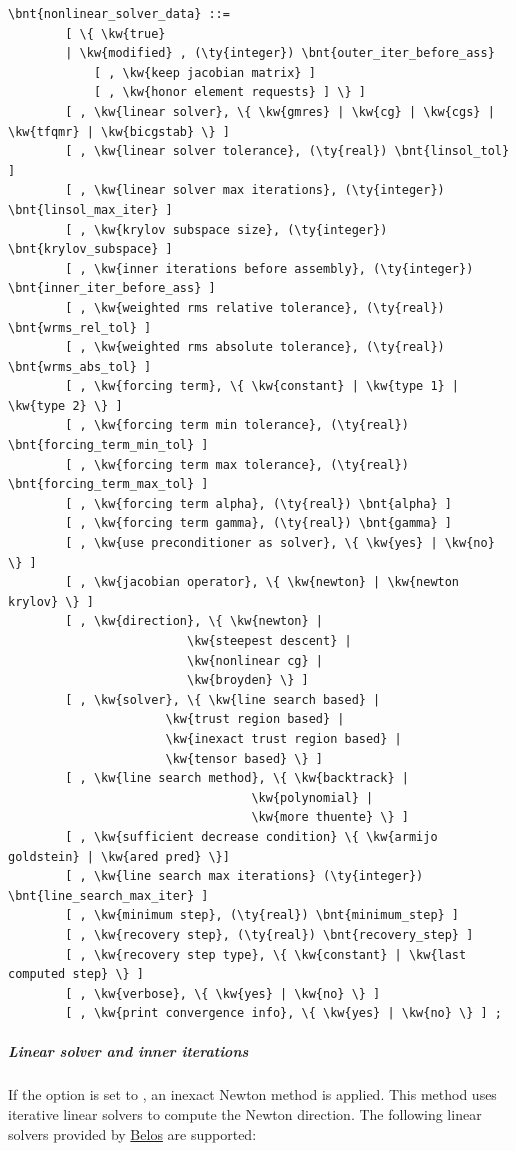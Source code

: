 \begin{Verbatim}[commandchars=\\\{\}]
    \bnt{nonlinear_solver_data} ::=
        [ \{ \kw{true}
        | \kw{modified} , (\ty{integer}) \bnt{outer_iter_before_ass}
            [ , \kw{keep jacobian matrix} ]
            [ , \kw{honor element requests} ] \} ]
        [ , \kw{linear solver}, \{ \kw{gmres} | \kw{cg} | \kw{cgs} | \kw{tfqmr} | \kw{bicgstab} \} ]
        [ , \kw{linear solver tolerance}, (\ty{real}) \bnt{linsol_tol} ]
        [ , \kw{linear solver max iterations}, (\ty{integer}) \bnt{linsol_max_iter} ]
        [ , \kw{krylov subspace size}, (\ty{integer}) \bnt{krylov_subspace} ]
        [ , \kw{inner iterations before assembly}, (\ty{integer}) \bnt{inner_iter_before_ass} ]
        [ , \kw{weighted rms relative tolerance}, (\ty{real}) \bnt{wrms_rel_tol} ]
        [ , \kw{weighted rms absolute tolerance}, (\ty{real}) \bnt{wrms_abs_tol} ]
        [ , \kw{forcing term}, \{ \kw{constant} | \kw{type 1} | \kw{type 2} \} ]
        [ , \kw{forcing term min tolerance}, (\ty{real}) \bnt{forcing_term_min_tol} ]
        [ , \kw{forcing term max tolerance}, (\ty{real}) \bnt{forcing_term_max_tol} ]
        [ , \kw{forcing term alpha}, (\ty{real}) \bnt{alpha} ]
        [ , \kw{forcing term gamma}, (\ty{real}) \bnt{gamma} ]
        [ , \kw{use preconditioner as solver}, \{ \kw{yes} | \kw{no} \} ]
        [ , \kw{jacobian operator}, \{ \kw{newton} | \kw{newton krylov} \} ]
        [ , \kw{direction}, \{ \kw{newton} |
                         \kw{steepest descent} |
                         \kw{nonlinear cg} |
                         \kw{broyden} \} ]
        [ , \kw{solver}, \{ \kw{line search based} |
                      \kw{trust region based} |
                      \kw{inexact trust region based} |
                      \kw{tensor based} \} ]
        [ , \kw{line search method}, \{ \kw{backtrack} |
                                  \kw{polynomial} |
                                  \kw{more thuente} \} ]
        [ , \kw{sufficient decrease condition} \{ \kw{armijo goldstein} | \kw{ared pred} \}]
        [ , \kw{line search max iterations} (\ty{integer}) \bnt{line_search_max_iter} ]
        [ , \kw{minimum step}, (\ty{real}) \bnt{minimum_step} ]
        [ , \kw{recovery step}, (\ty{real}) \bnt{recovery_step} ]
        [ , \kw{recovery step type}, \{ \kw{constant} | \kw{last computed step} \} ]
        [ , \kw{verbose}, \{ \kw{yes} | \kw{no} \} ]
        [ , \kw{print convergence info}, \{ \kw{yes} | \kw{no} \} ] ;
\end{Verbatim}
\subparagraph{Linear solver and inner iterations}
If the option  is set to , an inexact Newton method is applied. This method uses iterative linear solvers to compute the Newton direction. The following linear solvers provided by \href{https://trilinos.github.io/belos.html}{Belos} are supported:
